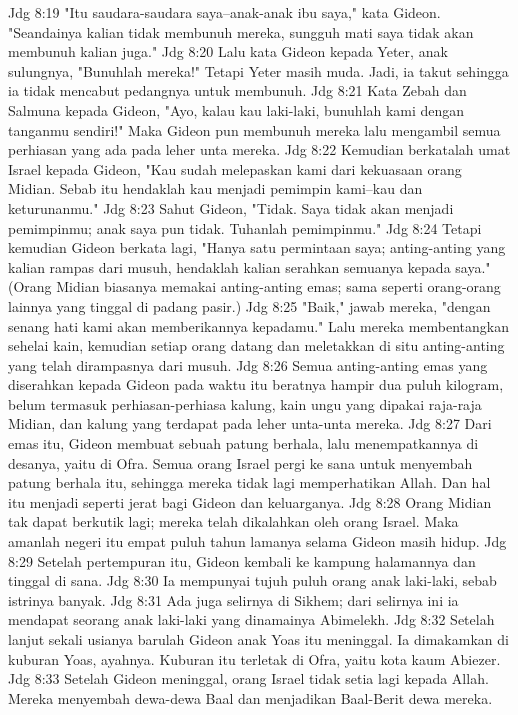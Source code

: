 Jdg 8:19  "Itu saudara-saudara saya--anak-anak ibu saya," kata Gideon. "Seandainya kalian tidak membunuh mereka, sungguh mati saya tidak akan membunuh kalian juga."
Jdg 8:20  Lalu kata Gideon kepada Yeter, anak sulungnya, "Bunuhlah mereka!" Tetapi Yeter masih muda. Jadi, ia takut sehingga ia tidak mencabut pedangnya untuk membunuh.
Jdg 8:21  Kata Zebah dan Salmuna kepada Gideon, "Ayo, kalau kau laki-laki, bunuhlah kami dengan tanganmu sendiri!" Maka Gideon pun membunuh mereka lalu mengambil semua perhiasan yang ada pada leher unta mereka.
Jdg 8:22  Kemudian berkatalah umat Israel kepada Gideon, "Kau sudah melepaskan kami dari kekuasaan orang Midian. Sebab itu hendaklah kau menjadi pemimpin kami--kau dan keturunanmu."
Jdg 8:23  Sahut Gideon, "Tidak. Saya tidak akan menjadi pemimpinmu; anak saya pun tidak. Tuhanlah pemimpinmu."
Jdg 8:24  Tetapi kemudian Gideon berkata lagi, "Hanya satu permintaan saya; anting-anting yang kalian rampas dari musuh, hendaklah kalian serahkan semuanya kepada saya." (Orang Midian biasanya memakai anting-anting emas; sama seperti orang-orang lainnya yang tinggal di padang pasir.)
Jdg 8:25  "Baik," jawab mereka, "dengan senang hati kami akan memberikannya kepadamu." Lalu mereka membentangkan sehelai kain, kemudian setiap orang datang dan meletakkan di situ anting-anting yang telah dirampasnya dari musuh.
Jdg 8:26  Semua anting-anting emas yang diserahkan kepada Gideon pada waktu itu beratnya hampir dua puluh kilogram, belum termasuk perhiasan-perhiasa kalung, kain ungu yang dipakai raja-raja Midian, dan kalung yang terdapat pada leher unta-unta mereka.
Jdg 8:27  Dari emas itu, Gideon membuat sebuah patung berhala, lalu menempatkannya di desanya, yaitu di Ofra. Semua orang Israel pergi ke sana untuk menyembah patung berhala itu, sehingga mereka tidak lagi memperhatikan Allah. Dan hal itu menjadi seperti jerat bagi Gideon dan keluarganya.
Jdg 8:28  Orang Midian tak dapat berkutik lagi; mereka telah dikalahkan oleh orang Israel. Maka amanlah negeri itu empat puluh tahun lamanya selama Gideon masih hidup.
Jdg 8:29  Setelah pertempuran itu, Gideon kembali ke kampung halamannya dan tinggal di sana.
Jdg 8:30  Ia mempunyai tujuh puluh orang anak laki-laki, sebab istrinya banyak.
Jdg 8:31  Ada juga selirnya di Sikhem; dari selirnya ini ia mendapat seorang anak laki-laki yang dinamainya Abimelekh.
Jdg 8:32  Setelah lanjut sekali usianya barulah Gideon anak Yoas itu meninggal. Ia dimakamkan di kuburan Yoas, ayahnya. Kuburan itu terletak di Ofra, yaitu kota kaum Abiezer.
Jdg 8:33  Setelah Gideon meninggal, orang Israel tidak setia lagi kepada Allah. Mereka menyembah dewa-dewa Baal dan menjadikan Baal-Berit dewa mereka.
